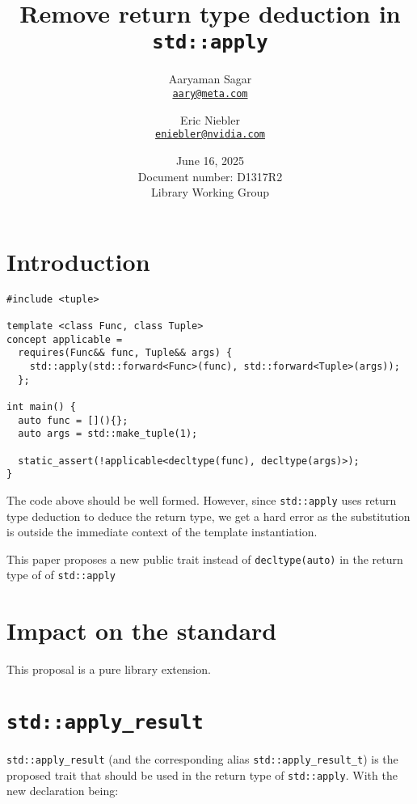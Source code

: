 \documentclass{article}
\begin{document}
\title{\textbf{Remove return type deduction in \texttt{std::apply}}}
\author{
  Aaryaman Sagar\\
  \href{mailto:aary@meta.com}{\texttt{aary@meta.com}}
  \and
  Eric Niebler\\
  \href{mailto:eniebler@nvidia.com}{\texttt{eniebler@nvidia.com}}
}
\date{June 16, 2025 \\ Document number: D1317R2 \\ Library Working Group}
\maketitle

\section{Introduction}

\begin{lstlisting}
#include <tuple>

template <class Func, class Tuple>
concept applicable =
  requires(Func&& func, Tuple&& args) {
    std::apply(std::forward<Func>(func), std::forward<Tuple>(args));
  };

int main() {
  auto func = [](){};
  auto args = std::make_tuple(1);

  static_assert(!applicable<decltype(func), decltype(args)>);
}
\end{lstlisting}

The code above should be well formed.  However, since \texttt{std::apply} uses
return type deduction to deduce the return type, we get a hard error as the
substitution is outside the immediate context of the template instantiation.

This paper proposes a new public trait instead of \texttt{decltype(auto)} in
the return type of of \texttt{std::apply}

\section{Impact on the standard}
This proposal is a pure library extension.

\section{\texttt{std::apply\_result}}
\texttt{std::apply\_result} (and the corresponding alias
\texttt{std::apply\_result\_t}) is the proposed trait that should be used in
the return type of \texttt{std::apply}.  With the new declaration being:
\end{document}
